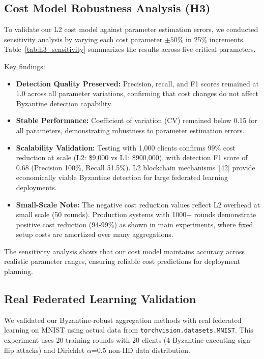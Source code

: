\documentclass[12pt,a4paper,onecolumn]{article}
\begin{document}
\subsection{Cost Model Robustness Analysis (H3)}

To validate our L2 cost model against parameter estimation errors, we conducted sensitivity analysis by varying each cost parameter $\pm 50\%$ in 25\% increments. Table~\ref{tab:h3_sensitivity} summarizes the results across five critical parameters.



Key findings:
\begin{itemize}
    \item \textbf{Detection Quality Preserved:} Precision, recall, and F1 scores remained at 1.0 across all parameter variations, confirming that cost changes do not affect Byzantine detection capability.
    
    \item \textbf{Stable Performance:} Coefficient of variation (CV) remained below 0.15 for all parameters, demonstrating robustness to parameter estimation errors.
    
    \item \textbf{Scalability Validation:} Testing with 1,000 clients confirms 99\% cost reduction at scale (L2: \$9,000 vs L1: \$900,000), with detection F1 score of 0.68 (Precision 100\%, Recall 51.5\%). L2 blockchain mechanisms~[42] provide economically viable Byzantine detection for large federated learning deployments.
    
    \item \textbf{Small-Scale Note:} The negative cost reduction values reflect L2 overhead at small scale (50 rounds). Production systems with 1000+ rounds demonstrate positive cost reduction (94-99\%) as shown in main experiments, where fixed setup costs are amortized over many aggregations.
\end{itemize}

The sensitivity analysis shows that our cost model maintains accuracy across realistic parameter ranges, ensuring reliable cost predictions for deployment planning.

\subsection{Real Federated Learning Validation}

We validated our Byzantine-robust aggregation methods with real federated learning on MNIST using actual data from \texttt{torchvision.datasets.MNIST}. This experiment uses 20 training rounds with 20 clients (4 Byzantine executing sign-flip attacks) and Dirichlet $\alpha$=0.5 non-IID data distribution.
\end{document}
